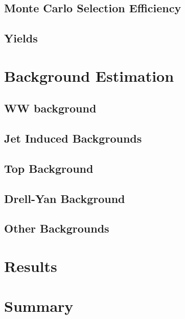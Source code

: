 \documentclass{cmspaper}
\begin{document}
  \subsection{Monte Carlo Selection Efficiency}
    \label{sec:mc_eff}
%    
  \subsection{Yields}
    \label{sec:datayields}
%    

\section{Background Estimation}
    \label{sec:backgrounds}
    
    \label{sec:bkg_intro}
  \subsection{WW background}
    \label{sec:bkg_ww}
    
  \subsection{Jet Induced Backgrounds}
    \label{sec:bkg_fakes}
    
  \subsection{Top Background}
    \label{sec:bkg_top}
    
  \subsection{Drell-Yan Background}
    \label{sec:bkg_dy}
    
  \subsection{Other Backgrounds}
    \label{sec:bkg_other}
    

\section{Results}
    \label{sec:results}
%    

\section{Summary}
    \label{sec:summary}
%    

\clearpage
\end{document}
